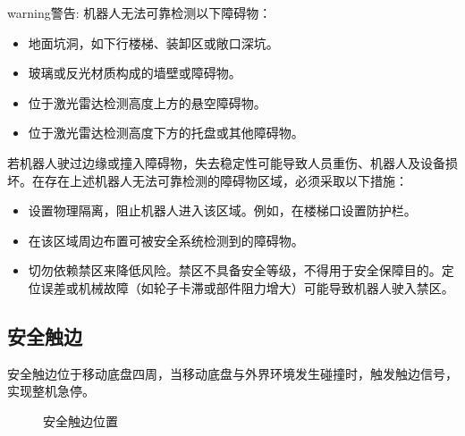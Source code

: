 \documentclass[a4paper,11pt,english,openany,oneside]{sphinxmanual}
\begin{document}
\begin{sphinxadmonition}{warning}{警告:}
\sphinxAtStartPar
机器人无法可靠检测以下障碍物：
\begin{itemize}
\item {} 
\sphinxAtStartPar
地面坑洞，如下行楼梯、装卸区或敞口深坑。

\item {} 
\sphinxAtStartPar
玻璃或反光材质构成的墙壁或障碍物。

\item {} 
\sphinxAtStartPar
位于激光雷达检测高度上方的悬空障碍物。

\item {} 
\sphinxAtStartPar
位于激光雷达检测高度下方的托盘或其他障碍物。

\end{itemize}

\sphinxAtStartPar
若机器人驶过边缘或撞入障碍物，失去稳定性可能导致人员重伤、机器人及设备损坏。在存在上述机器人无法可靠检测的障碍物区域，必须采取以下措施：
\begin{itemize}
\item {} 
\sphinxAtStartPar
设置物理隔离，阻止机器人进入该区域。例如，在楼梯口设置防护栏。

\item {} 
\sphinxAtStartPar
在该区域周边布置可被安全系统检测到的障碍物。

\item {} 
\sphinxAtStartPar
切勿依赖禁区来降低风险。禁区不具备安全等级，不得用于安全保障目的。定位误差或机械故障（如轮子卡滞或部件阻力增大）可能导致机器人驶入禁区。

\end{itemize}
\end{sphinxadmonition}


\subsection{安全触边}
\label{\detokenize{07 _u6280_u672f_u89c4_u683c:id37}}\label{\detokenize{07 _u6280_u672f_u89c4_u683c:id38}}
\sphinxAtStartPar
安全触边位于移动底盘四周，当移动底盘与外界环境发生碰撞时，触发触边信号，实现整机急停。

\begin{figure}[H]
\centering
\capstart

\noindent{}
\caption{安全触边位置}\label{\detokenize{07 _u6280_u672f_u89c4_u683c:id76}}\end{figure}
\end{document}

